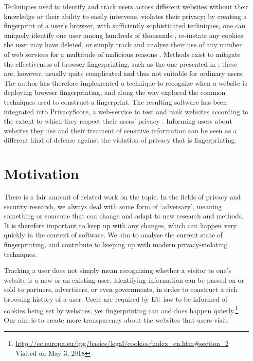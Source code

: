 \documentclass[
    fontsize=12pt,
    headings=small,
    parskip=half,
    bibliography=totoc,
    numbers=noenddot,
    open=any
    ]{scrreprt}
\begin{document}
Techniques used to identify and track users across different websites without
their knowledge or their ability to easily intervene, violates their privacy; by creating a fingerprint
of a user's browser, with sufficiently sophisticated techniques, one can uniquely identify one user
among hundreds of thousands \cite{am_i_unique}, re-instate any cookies the user may have deleted,
or simply track and analyse their use of any number of web services for a multitude of malicious reasons \cite{eckersley2010unique}.
Methods exist to mitigate the effectiveness of browser fingerprinting, such as the one presented
in \cite{laperdrix2015mitigating};
these are, however, usually quite complicated and thus not suitable for ordinary users.
The author has therefore implemented a technique to recognize when a website is deploying browser fingerprinting,
and along the way explored the common techniques used to construct a fingerprint. The resulting software has been integrated into
PrivacyScore, a web-service to test and rank websites according to the extent to which they
respect their users' privacy \cite{privacyscore}.
Informing users about websites they use and their treament of sensitive information
can be seen as a different kind of defense against the violation of privacy that is fingerprinting.

\section{Motivation}
There is a fair amount of related work on the topic. In the fields of privacy and security research,
we always deal with some form of `adversary', meaning something or someone that can change and adapt to new
research and methods. It is therefore important to keep up with any changes, which can happen very quickly
in the context of software.
We aim to analyse the current state of fingerprinting, and contribute to keeping up with modern privacy-violating
techniques.

Tracking a user does not simply mean recognizing whether a visitor to one's website is a new or an existing user.
Identifying information can be passed on or sold to partners, advertisers, or even governments, in order to
construct a rich browsing history of a user. Users are required by EU law to be informed of cookies being set
by websites, yet fingerprinting can and does happen quietly.\footnote{\url{http://ec.europa.eu/ipg/basics/legal/cookies/index\_en.htm\#section\_2} Visited on May 3, 2018}
Our aim is to create more transparency about the websites that users visit.
\end{document}
